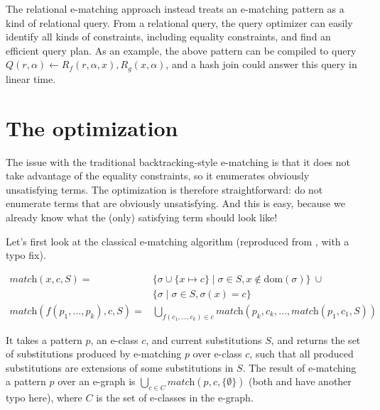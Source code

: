 The relational e-matching approach instead treats an e-matching pattern
 as a kind of relational query.
From a relational query, 
 the query optimizer can easily identify all kinds of constraints, 
 including equality constraints,
 and find an efficient query plan.
As an example,
 the above pattern can be compiled to query
 \(Q(r, \alpha)\gets R_f(r, \alpha,x),R_g(x,\alpha)\), 
 and a hash join could answer this query in linear time.

\section{The optimization}\label{the-optimization}

The issue with the traditional backtracking-style e-matching 
 is that it does not take advantage of the equality constraints, 
 so it enumerates obviously unsatisfying terms.
The optimization is therefore straightforward: 
 do not enumerate terms that are obviously unsatisfying.
And this is easy, because we already know what the (only) satisfying
 term should look like!

Let's first look at the classical e-matching algorithm 
 (reproduced from \citet[Figure~3]{relational-ematching}, with a typo fix).

\begin{align*}
    \textit{match}(x,c,S) = 
                   & \{ \sigma \cup \{ x \mapsto c\} \mid \sigma \in S, x \not \in \text{dom}(\sigma)\}\ \cup\\
                   & \{ \sigma \mid \sigma \in S, \sigma(x) = c \}\\
    \textit{match}(f(p_{1}, \dots, p_{k}), c, S) = 
                   & \bigcup_{f(c_{1},\dots,c_{k})\in c}
                     \textit{match}(p_{k}, c_{k}, \dots, \textit{match}(p_{1}, c_{1}, S))
\end{align*}

It takes a pattern \(p\), an e-class \(c\), 
 and current substitutions \(S\),
 and returns the set of substitutions produced by e-matching \(p\)
 over e-class \(c\),
 such that all produced substitutions are extensions
 of some substitutions in \(S\).
The result of e-matching a pattern \(p\)
 over an e-graph is
 \(\bigcup_{c\in C} \textit{match}(p, c, \{\emptyset\})\)
 (both \citet{relational-ematching} and \citet{efficient-ematching}
 have another typo here), where \(C\) is the
 set of e-classes in the e-graph.

